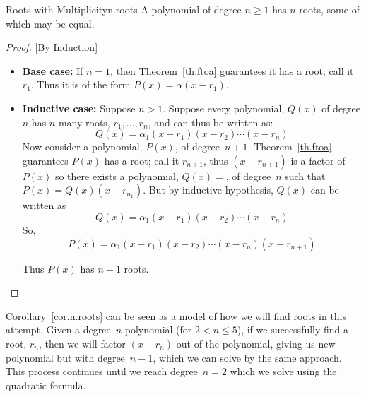 \begin{corollary}{Roots with Multiplicity}{n.roots}
  A polynomial of degree $n\ge 1$ has $n$ roots, some of which may be
  equal.
\end{corollary}
\begin{proof}

  [By Induction]
  
  \begin{itemize}
    
  \item \textbf{Base case:} If $n=1$, then Theorem~\ref{th.ftoa}
    guarantees it has a root; call it $r_1$.  Thus it is of the form
    $P(x)=\alpha (x-r_1)$.
  \item \textbf{Inductive case:} Suppose $n>1$.  Suppose every
    polynomial, $Q(x)$ of degree $n$ has $n$-many roots,
    $r_1,\ldots,r_n$, and can thus be written as:
    \[Q(x) = \alpha_1 (x - r_1) (x - r_2) \cdots (x - r_n)\]
    Now consider a polynomial, $P(x)$, of
    degree~$n+1$.  Theorem~\ref{th.ftoa} guarantees $P(x)$ has a root;
    call it $r_{n+1}$, thus $(x-r_{n+1})$ is a factor of $P(x)$ so there
    exists a polynomial, $Q(x)=$, of degree~$n$ such that
    $P(x) =  Q(x) (x-r_{n_1})$.
    But by inductive hypothesis, $Q(x)$ can be written
    as \[Q(x) = \alpha_1 (x - r_1) (x - r_2) \cdots (x - r_n)\]
    So, \[P(x) = \alpha_1 (x - r_1) (x - r_2) \cdots (x - r_n) (x-r_{n+1})\]

    Thus $P(x)$ has $n+1$ roots.
  \end{itemize}
\end{proof}

Corollary~\ref{cor.n.roots} can be seen as a model of how we will find
roots in this attempt.  Given a degree~$n$ polynomial (for $2<n\leq
5$), if we successfully find a root, $r_n$, then we will factor
$(x-r_n)$ out of the polynomial, giving us new polynomial but with
degree~$n-1$, which we can solve by the same approach.  This process
continues until we reach degree~$n=2$ which we solve using the
quadratic formula.

